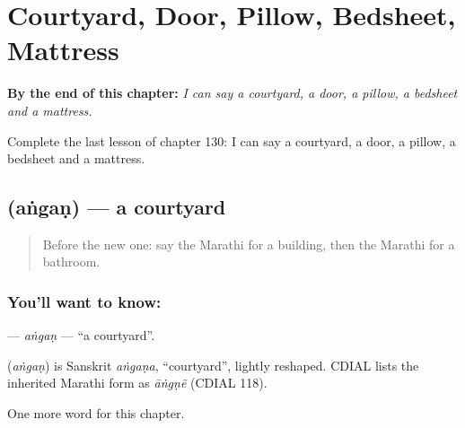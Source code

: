 
\chapter{Courtyard, Door, Pillow, Bedsheet, Mattress}
\label{ch:mr-courtyard-door-pillow-bedsheet-mattress}

\begin{chapteropening}
\textbf{By the end of this chapter:} \emph{I can say a courtyard, a door, a pillow, a bedsheet and a mattress.}

Complete the last lesson of chapter 130: I can say a courtyard, a door, a pillow, a bedsheet and a mattress.
\end{chapteropening}

\section[\texorpdfstring{\mr{अंगण} (aṅgaṇ)}{अंगण (aṅgaṇ)}]{ (aṅgaṇ) — a courtyard}

\label{lesson:MR-C130-angan}



\begin{quote}
Before the new one: say the Marathi for a building, then the Marathi for a bathroom.
\end{quote}

\subsection*{You'll want to know: }
\textbf{} — \emph{aṅgaṇ} — \textquotedblleft{}a courtyard\textquotedblright{}.

\begin{cousinweb}
\textbf{} (\emph{aṅgaṇ}) is Sanskrit \emph{aṅgaṇa}, \textquotedblleft{}courtyard\textquotedblright{}, lightly reshaped. CDIAL lists the inherited Marathi form as \emph{āṅgṇẽ} (CDIAL 118).
\end{cousinweb}

\begin{grammarlens}[title={What you've built}]
One more word for this chapter.
\end{grammarlens}

